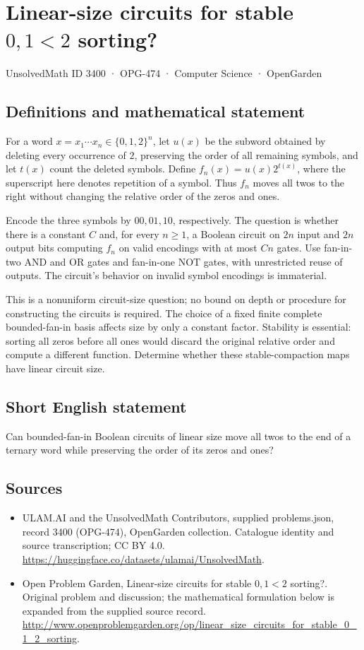 \documentclass[11pt,a4paper]{article}
\begin{document}
\section*{Linear-size circuits for stable $0,1 < 2$ sorting?}\label{3400}
{\small UnsolvedMath ID 3400 · OPG-474 · Computer Science · OpenGarden}
\subsection{Definitions and mathematical statement}
For a word $x=x_1\cdots x_n\in\{0,1,2\}^n$, let $u(x)$ be the
subword obtained by deleting every occurrence of $2$, preserving
the order of all remaining symbols, and let $t(x)$ count the deleted
symbols. Define $f_n(x)=u(x)2^{t(x)}$, where the superscript here
denotes repetition of a symbol. Thus $f_n$ moves all twos to the
right without changing the relative order of the zeros and ones.

Encode the three symbols by $00,01,10$, respectively. The question
is whether there is a constant $C$ and, for every $n\ge1$, a Boolean
circuit on $2n$ input and $2n$ output bits computing $f_n$ on valid
encodings with at most $Cn$ gates. Use fan-in-two AND and OR gates
and fan-in-one NOT gates, with unrestricted reuse of outputs.
The circuit's behavior on invalid symbol encodings is immaterial.

This is a nonuniform circuit-size question; no bound on depth or
procedure for constructing the circuits is required. The choice of
a fixed finite complete bounded-fan-in basis affects size by only
a constant factor. Stability is essential: sorting all zeros before
all ones would discard the original relative order and compute a
different function. Determine whether these stable-compaction maps
have linear circuit size.
\subsection{Short English statement}
Can bounded-fan-in Boolean circuits of linear size move all twos to the end of a ternary word while preserving the order of its zeros and ones?
\subsection{Sources}
\begin{itemize}
\item[S1] ULAM.AI and the UnsolvedMath Contributors, supplied problems.json, record 3400 (OPG-474), OpenGarden collection. Catalogue identity and source transcription; CC BY 4.0.
\url{https://huggingface.co/datasets/ulamai/UnsolvedMath}.
\item[S2] Open Problem Garden, Linear-size circuits for stable $0,1 < 2$ sorting?. Original problem and discussion; the mathematical formulation below is expanded from the supplied source record.
\url{http://www.openproblemgarden.org/op/linear_size_circuits_for_stable_0_1_2_sorting}.
\end{itemize}
\end{document}
